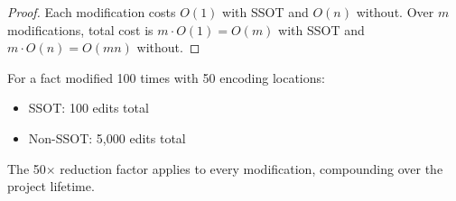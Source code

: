 \begin{proof}
Each modification costs $O(1)$ with SSOT and $O(n)$ without. Over $m$ modifications, total cost is $m \cdot O(1) = O(m)$ with SSOT and $m \cdot O(n) = O(mn)$ without.
\end{proof}

For a fact modified 100 times with 50 encoding locations:
\begin{itemize}
\tightlist
\item SSOT: 100 edits total
\item Non-SSOT: 5,000 edits total
\end{itemize}

The 50$\times$ reduction factor applies to every modification, compounding over the project lifetime.


